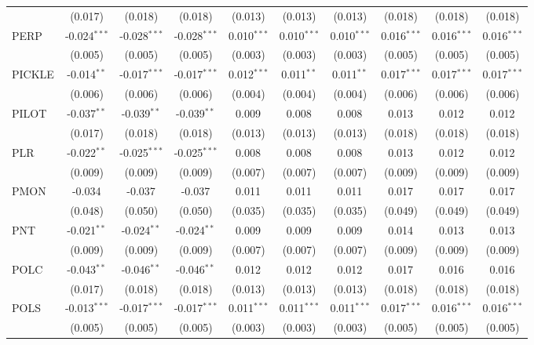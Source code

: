 \begin{table}[!htbp]
\begin{tabular}{@{\extracolsep{5pt}}lccccccccc}
  & (0.017) & (0.018) & (0.018) & (0.013) & (0.013) & (0.013) & (0.018) & (0.018) & (0.018) \\
 PERP & -0.024$^{***}$ & -0.028$^{***}$ & -0.028$^{***}$ & 0.010$^{***}$ & 0.010$^{***}$ & 0.010$^{***}$ & 0.016$^{***}$ & 0.016$^{***}$ & 0.016$^{***}$ \\
  & (0.005) & (0.005) & (0.005) & (0.003) & (0.003) & (0.003) & (0.005) & (0.005) & (0.005) \\
 PICKLE & -0.014$^{**}$ & -0.017$^{***}$ & -0.017$^{***}$ & 0.012$^{***}$ & 0.011$^{**}$ & 0.011$^{**}$ & 0.017$^{***}$ & 0.017$^{***}$ & 0.017$^{***}$ \\
  & (0.006) & (0.006) & (0.006) & (0.004) & (0.004) & (0.004) & (0.006) & (0.006) & (0.006) \\
 PILOT & -0.037$^{**}$ & -0.039$^{**}$ & -0.039$^{**}$ & 0.009$^{}$ & 0.008$^{}$ & 0.008$^{}$ & 0.013$^{}$ & 0.012$^{}$ & 0.012$^{}$ \\
  & (0.017) & (0.018) & (0.018) & (0.013) & (0.013) & (0.013) & (0.018) & (0.018) & (0.018) \\
 PLR & -0.022$^{**}$ & -0.025$^{***}$ & -0.025$^{***}$ & 0.008$^{}$ & 0.008$^{}$ & 0.008$^{}$ & 0.013$^{}$ & 0.012$^{}$ & 0.012$^{}$ \\
  & (0.009) & (0.009) & (0.009) & (0.007) & (0.007) & (0.007) & (0.009) & (0.009) & (0.009) \\
 PMON & -0.034$^{}$ & -0.037$^{}$ & -0.037$^{}$ & 0.011$^{}$ & 0.011$^{}$ & 0.011$^{}$ & 0.017$^{}$ & 0.017$^{}$ & 0.017$^{}$ \\
  & (0.048) & (0.050) & (0.050) & (0.035) & (0.035) & (0.035) & (0.049) & (0.049) & (0.049) \\
 PNT & -0.021$^{**}$ & -0.024$^{**}$ & -0.024$^{**}$ & 0.009$^{}$ & 0.009$^{}$ & 0.009$^{}$ & 0.014$^{}$ & 0.013$^{}$ & 0.013$^{}$ \\
  & (0.009) & (0.009) & (0.009) & (0.007) & (0.007) & (0.007) & (0.009) & (0.009) & (0.009) \\
 POLC & -0.043$^{**}$ & -0.046$^{**}$ & -0.046$^{**}$ & 0.012$^{}$ & 0.012$^{}$ & 0.012$^{}$ & 0.017$^{}$ & 0.016$^{}$ & 0.016$^{}$ \\
  & (0.017) & (0.018) & (0.018) & (0.013) & (0.013) & (0.013) & (0.018) & (0.018) & (0.018) \\
 POLS & -0.013$^{***}$ & -0.017$^{***}$ & -0.017$^{***}$ & 0.011$^{***}$ & 0.011$^{***}$ & 0.011$^{***}$ & 0.017$^{***}$ & 0.016$^{***}$ & 0.016$^{***}$ \\
  & (0.005) & (0.005) & (0.005) & (0.003) & (0.003) & (0.003) & (0.005) & (0.005) & (0.005) \\

\end{tabular}
\end{table}
